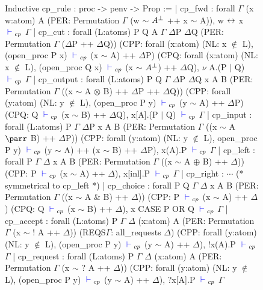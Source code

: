 \begin{figure}
\begin{coq}
Inductive cp_rule : proc -> penv -> Prop :=
  | cp_fwd : forall $\Gamma$ (x w:atom) A
        (PER: Permutation $\Gamma$ (w $\sim$ $A^\bot$ ++ x $\sim$ A)),
      w ${\leftrightarrow}$ x ${\color{blue} {} \vdash {}}_{cp}$ $\Gamma$
  | cp_cut :
      forall (L:atoms) P Q A $\Gamma$ $\Delta$P $\Delta$Q
             (PER: Permutation $\Gamma$ ($\Delta$P ++ $\Delta$Q))
             (CPP: forall (x:atom) (NL: x $\notin$ L),
                     (open_proc P x) ${\color{blue} {} \vdash {}}_{cp}$ (x $\sim$ A) ++ $\Delta$P)
             (CPQ: forall (x:atom) (NL: x $\notin$ L),
                (open_proc Q x) ${\color{blue} {} \vdash {}}_{cp}$ (x $\sim$ $A^\bot$) ++ $\Delta$Q),
        $\nu$ A.(P $\mid$ Q) ${\color{blue} {} \vdash {}}_{cp}$ $\Gamma$
  | cp_output : forall (L:atoms) P Q $\Gamma$ $\Delta$P $\Delta$Q x A B
             (PER: Permutation $\Gamma$ ((x $\sim$ A $\otimes$ B) ++
                                             $\Delta$P ++ $\Delta$Q))
             (CPP: forall (y:atom) (NL: y $\notin$ L),
                     (open_proc P y) ${\color{blue} {} \vdash {}}_{cp}$ (y $\sim$ A) ++ $\Delta$P)
             (CPQ: Q ${\color{blue} {} \vdash {}}_{cp}$ (x $\sim$ B) ++ $\Delta$Q),
        x[A].(P $\mid$ Q) ${\color{blue} {} \vdash {}}_{cp}$ $\Gamma$
  | cp_input : forall (L:atoms) P $\Gamma$ $\Delta$P x A B
         (PER: Permutation $\Gamma$ ((x $\sim$ A $\parr$ B) ++ $\Delta$P))
         (CPP: forall (y:atom) (NL: y $\notin$ L),
            open_proc P y) ${\color{blue} {} \vdash {}}_{cp}$ (y $\sim$ A) ++ (x $\sim$ B) ++ $\Delta$P),
        x(A).P ${\color{blue} {} \vdash {}}_{cp}$ $\Gamma$
  | cp_left : forall P $\Gamma$ $\Delta$ x A B
            (PER: Permutation $\Gamma$ ((x $\sim$ A $\oplus$ B) ++ $\Delta$))
            (CPP: P ${\color{blue} {} \vdash {}}_{cp}$ (x $\sim$ A) ++ $\Delta$),
          x[inl].P ${\color{blue} {} \vdash {}}_{cp}$ $\Gamma$
  | cp_right : $\cdots$ (* symmetrical to cp_left *)
  | cp_choice : forall P Q $\Gamma$ $\Delta$ x A B
         (PER: Permutation $\Gamma$ ((x $\sim$ A & B) ++ $\Delta$))
         (CPP: P ${\color{blue} {} \vdash {}}_{cp}$ (x $\sim$ A) ++ $\Delta$)
         (CPQ: Q ${\color{blue} {} \vdash {}}_{cp}$ (x $\sim$ B) ++ $\Delta$),
       x CASE P OR Q ${\color{blue} {} \vdash {}}_{cp}$ $\Gamma$
  | cp_accept : forall (L:atoms) P $\Gamma$ $\Delta$ (x:atom) A
         (PER: Permutation $\Gamma$ (x $\sim$ ! A ++ $\Delta$))
         (REQS$\Gamma$: all_requests $\Delta$)
         (CPP: forall (y:atom) (NL: y $\notin$ L),
                 (open_proc P y) ${\color{blue} {} \vdash {}}_{cp}$ (y $\sim$ A) ++ $\Delta$),
       !x(A).P ${\color{blue} {} \vdash {}}_{cp}$ $\Gamma$
  | cp_request : forall (L:atoms) P $\Gamma$ $\Delta$ (x:atom) A
         (PER: Permutation $\Gamma$ (x $\sim$ ? A ++ $\Delta$))
         (CPP: forall (y:atom) (NL: y $\notin$ L),
                 (open_proc P y) ${\color{blue} {} \vdash {}}_{cp}$ (y $\sim$ A) ++ $\Delta$),
       ?x[A].P ${\color{blue} {} \vdash {}}_{cp}$ $\Gamma$

\end{coq}
\end{figure}
